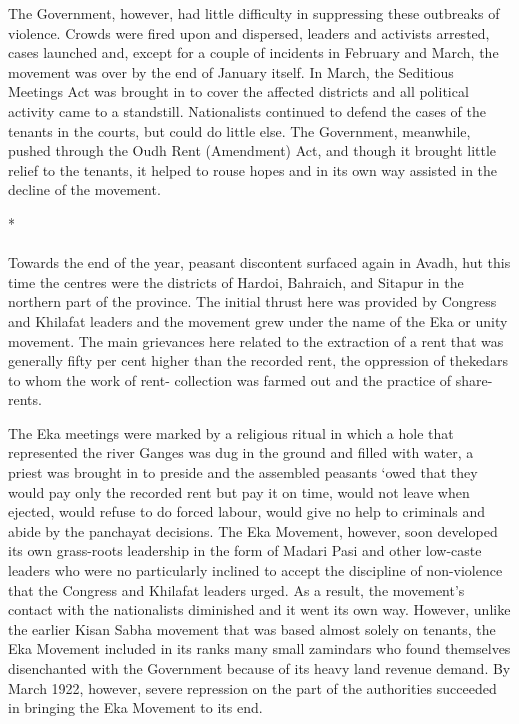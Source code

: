 \begin{multicols}{2}
The Government, however, had little difficulty in suppressing these outbreaks of violence. Crowds were fired upon and dispersed, leaders and activists arrested, cases launched and, except for a couple of incidents in February and March, the movement was over by the end of January itself. In March, the Seditious Meetings Act was brought in to cover the affected districts and all political activity came to a standstill. Nationalists continued to defend the cases of the tenants in the courts, but could do little else. The Government, meanwhile, pushed through the Oudh Rent (Amendment) Act, and though it brought little relief to the tenants, it helped to rouse hopes and in its own way assisted in the decline of the movement.

\begin{center}*\end{center}

\paragraph*{}

Towards the end of the year, peasant discontent surfaced again in Avadh, hut this time the centres were the districts of Hardoi, Bahraich, and Sitapur in the northern part of the province. The initial thrust here was provided by Congress and Khilafat leaders and the movement grew under the name of the Eka or unity movement. The main grievances here related to the extraction of a rent that was generally fifty per cent higher than the recorded rent, the oppression of thekedars to whom the work of rent- collection was farmed out and the practice of share-rents.

The Eka meetings were marked by a religious ritual in which a hole that represented the river Ganges was dug in the ground and filled with water, a priest was brought in to preside and the assembled peasants `owed that they would pay only the recorded rent but pay it on time, would not leave when ejected, would refuse to do forced labour, would give no help to criminals and abide by the panchayat decisions. The Eka Movement, however, soon developed its own grass-roots leadership in the form of Madari Pasi and other low-caste leaders who were no particularly inclined to accept the discipline of non-violence that the Congress and Khilafat leaders urged. As a result, the movement's contact with the nationalists diminished and it went its own way. However, unlike the earlier Kisan Sabha movement that was based almost solely on tenants, the Eka Movement included in its ranks many small zamindars who found themselves disenchanted with the Government because of its heavy land revenue demand. By March 1922, however, severe repression on the part of the authorities succeeded in bringing the Eka Movement to its end.


\end{multicols}
